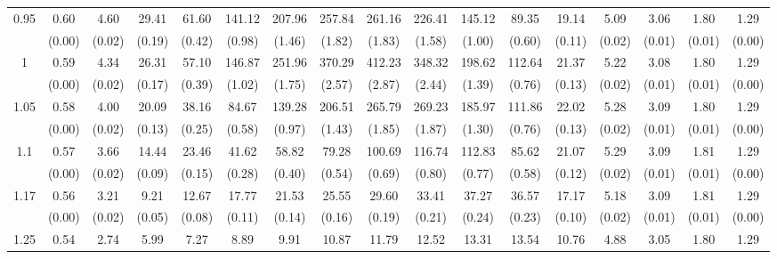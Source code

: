 \documentclass[12pt]{article}  %
\theoremstyle{plain}
\begin{document}
\begin{sidewaystable}[htbp]
\begin{tabular}{ccccccccccccccccc}
\multirow{2}{*}{0.95}  &0.60 &4.60& 29.41 &61.60 &141.12 &207.96& 257.84 &261.16& 226.41& 145.12 & 89.35& 19.14 & 5.09 & 3.06 & 1.80 & 1.29 \\                
					  & (0.00)& (0.02)& (0.19)& (0.42)& (0.98)& (1.46)& (1.82)& (1.83)& (1.58)&  (1.00)&  (0.60)&  (0.11)&  (0.02)&  (0.01)&  (0.01) &    (0.00)\\ \hline
\multirow{2}{*}{1}  & 0.59 &4.34 &26.31& 57.10 &146.87 &251.96& 370.29 &412.23 &348.32 &198.62 &112.64& 21.37 & 5.22 & 3.08 & 1.80 & 1.29\\
                      & (0.00)& (0.02)& (0.17)& (0.39)& (1.02)& (1.75)& (2.57)& (2.87)& (2.44)&  (1.39)&  (0.76)&  (0.13)&  (0.02)&  (0.01)&  (0.01) &     (0.00)\\ \hline                                                                     
\multirow{2}{*}{1.05}  & 0.58& 4.00& 20.09& 38.16&  84.67& 139.28& 206.51& 265.79& 269.23& 185.97& 111.86 &22.02 & 5.28 & 3.09 & 1.80 & 1.29\\
                      & (0.00)& (0.02)& (0.13)& (0.25)& (0.58)& (0.97)& (1.43)& (1.85)& (1.87)&  (1.30)& (0.76)&  (0.13)&  (0.02)&  (0.01)&  (0.01)  &     (0.00)\\ \hline                                                                                                                                          
\multirow{2}{*}{1.1}  &0.57 &3.66& 14.44& 23.46 & 41.62 & 58.82 & 79.28& 100.69 &116.74& 112.83 & 85.62& 21.07 & 5.29 & 3.09 & 1.81 & 1.29\\
                      &  (0.00)& (0.02)& (0.09)& (0.15)& (0.28)& (0.40)& (0.54)& (0.69)& (0.80)&  (0.77)&  (0.58)&  (0.12)&  (0.02)&  (0.01)&  (0.01)  &     (0.00)\\ \hline
\multirow{2}{*}{1.17}  &0.56& 3.21 & 9.21& 12.67 & 17.77 & 21.53&  25.55 & 29.60 & 33.41 & 37.27 & 36.57& 17.17 & 5.18 & 3.09  &1.81 & 1.29\\
                      & (0.00)& (0.02)& (0.05)& (0.08)& (0.11)& (0.14)& (0.16)& (0.19)& (0.21)&  (0.24)&  (0.23)&  (0.10)&  (0.02)&  (0.01)&  (0.01)    &   (0.00)\\ \hline                                                                                                                                                                                                                                                                                    
                                                                     \multirow{2}{*}{1.25}  &0.54 &2.74 & 5.99 & 7.27  & 8.89 &  9.91 & 10.87 & 11.79 & 12.52 & 13.31 & 13.54 &10.76 & 4.88 & 3.05 & 1.80 & 1.29\\

\end{tabular}
\end{sidewaystable}
\end{document}
